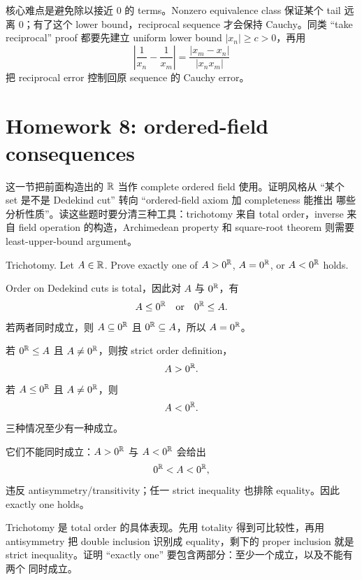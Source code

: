\begin{explanation}
核心难点是避免除以接近 \(0\) 的 terms。Nonzero equivalence class 保证某个 tail
远离 \(0\)；有了这个 lower bound，reciprocal sequence 才会保持 Cauchy。同类
``take reciprocal'' proof 都要先建立 uniform lower bound \(|x_n|\geq c>0\)，再用
\[
  \left|\frac1{x_n}-\frac1{x_m}\right|
  =\frac{|x_m-x_n|}{|x_nx_m|}
\]
把 reciprocal error 控制回原 sequence 的 Cauchy error。
\end{explanation}

\section{Homework 8: ordered-field consequences}

这一节把前面构造出的 \(\mathbb{R}\) 当作 complete ordered field 使用。证明风格从
``某个 set 是不是 Dedekind cut'' 转向 ``ordered-field axiom 加 completeness 能推出
哪些分析性质''。读这些题时要分清三种工具：trichotomy 来自 total order，inverse
来自 field operation 的构造，Archimedean property 和 square-root theorem 则需要
least-upper-bound argument。

\begin{exerciseblock}
Trichotomy. Let \(A\in\mathbb{R}\). Prove exactly one of \(A>0^{\mathbb{R}}\), \(A=0^{\mathbb{R}}\),
or \(A<0^{\mathbb{R}}\) holds.
\end{exerciseblock}

\begin{solution}
Order on Dedekind cuts is total，因此对 \(A\) 与 \(0^{\mathbb{R}}\)，有
\[
  A\leq0^{\mathbb{R}}\quad\text{or}\quad0^{\mathbb{R}}\leq A.
\]
若两者同时成立，则 \(A\subseteq0^{\mathbb{R}}\) 且 \(0^{\mathbb{R}}\subseteq A\)，所以
\(A=0^{\mathbb{R}}\)。

若 \(0^{\mathbb{R}}\leq A\) 且 \(A\ne0^{\mathbb{R}}\)，则按 strict order definition，
\[
  A>0^{\mathbb{R}}.
\]
若 \(A\leq0^{\mathbb{R}}\) 且 \(A\ne0^{\mathbb{R}}\)，则
\[
  A<0^{\mathbb{R}}.
\]
三种情况至少有一种成立。

它们不能同时成立：\(A>0^{\mathbb{R}}\) 与 \(A<0^{\mathbb{R}}\) 会给出
\[
  0^{\mathbb{R}}<A<0^{\mathbb{R}},
\]
违反 antisymmetry/transitivity；任一 strict inequality 也排除 equality。因此
exactly one holds。
\end{solution}

\begin{explanation}
Trichotomy 是 total order 的具体表现。先用 totality 得到可比较性，再用
antisymmetry 把 double inclusion 识别成 equality，剩下的 proper inclusion 就是
strict inequality。证明 ``exactly one'' 要包含两部分：至少一个成立，以及不能有两个
同时成立。
\end{explanation}

